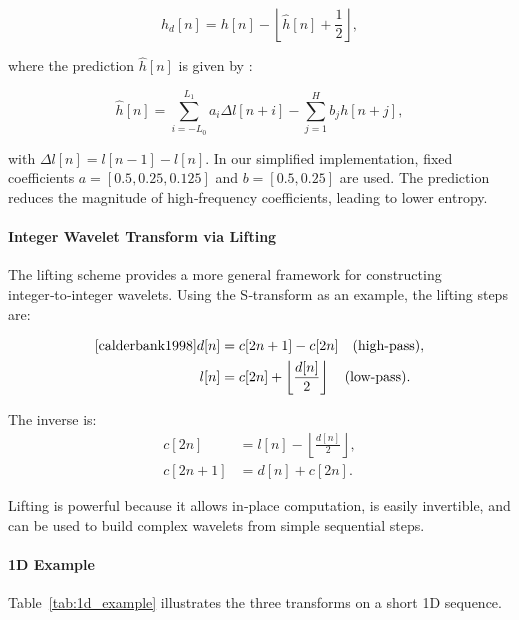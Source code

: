 \[
h_d[n] = h[n] - \left\lfloor \hat{h}[n] + \frac{1}{2} \right\rfloor, 
\]

where the prediction \(\hat{h}[n]\) is given by \cite{Said1996}:

\[
\hat{h}[n] = \sum_{i=-L_0}^{L_1} a_i \Delta l[n+i] - \sum_{j=1}^{H} b_j h[n+j], 
\]

with \(\Delta l[n] = l[n-1] - l[n]\). In our simplified implementation, fixed coefficients \(a = [0.5, 0.25, 0.125]\) and \(b = [0.5, 0.25]\) are used. The prediction reduces the magnitude of high‑frequency coefficients, leading to lower entropy.

\paragraph{Integer Wavelet Transform via Lifting}
The lifting scheme provides a more general framework for constructing integer‑to‑integer wavelets. Using the S‑transform as an example, the lifting steps are:

\[
\begin{aligned} \cite{calderbank1998}
d[n] &= c[2n+1] - c[2n] \quad \text{(high‑pass)},\\
l[n] &= c[2n] + \left\lfloor \frac{d[n]}{2} \right\rfloor \quad \text{(low‑pass)}.
\end{aligned}
\]

The inverse is\cite{calderbank1998}:
\[ 
\begin{aligned}
c[2n] &= l[n] - \left\lfloor \frac{d[n]}{2} \right\rfloor,\\
c[2n+1] &= d[n] + c[2n].
\end{aligned}
\]

Lifting is powerful because it allows in‑place computation, is easily invertible, and can be used to build complex wavelets from simple sequential steps.

\paragraph{1D Example}
Table~\ref{tab:1d_example} illustrates the three transforms on a short 1D sequence.

